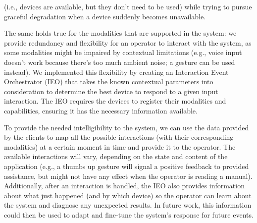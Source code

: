 (i.e., devices are available, but they don't need to be used) while trying to pursue graceful degradation when a device suddenly becomes unavailable. 


The same holds true for the modalities that are supported in the system: we provide redundancy and flexibility for an operator to interact with the system, as some modalities might be impaired by contextual limitations (e.g., voice input doesn't work because there's too much ambient noise; a gesture can be used instead).
We implemented this flexibility by creating an Interaction Event Orchestrator (IEO) that takes the known contextual parameters into consideration to determine the best device to respond to a given input interaction. The IEO requires the devices to register their modalities and capabilities, ensuring it has the necessary information available.

To provide the needed intelligibility to the system, we can use the data provided by the clients to map all the possible interactions (with their corresponding modalities) at a certain moment in time and provide it to the operator. The available interactions will vary, depending on the state and content of the application (e.g., a thumbs up gesture will signal a positive feedback to provided assistance, but might not have any effect when the operator is reading a manual). 
Additionally, after an interaction is handled, the IEO also provides information about what just happened (and by which device) so the operator can learn about the system and diagnose any unexpected results. In future work, this information could then be used to adapt and fine-tune the system's response for future events.

